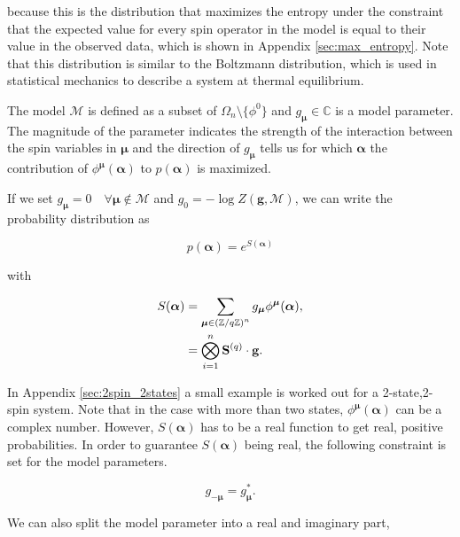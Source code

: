 \noindent
because this is the distribution that maximizes the entropy under the constraint that the expected value for every spin operator in the model is equal to their value in the observed data, which is shown in Appendix \ref{sec:max_entropy}.
Note that this distribution is similar to the Boltzmann distribution, which is used in statistical mechanics to describe a system at thermal equilibrium.

The model $\mathcal{M}$ is defined as a subset of $\Omega_n \setminus \{ \phi^0 \}$ and $g_{\boldsymbol{\mu}} \in {\mathbb{C}}$ is a model parameter. 
The magnitude of the parameter indicates the strength of the interaction between the spin variables in $\boldsymbol{\mu}$ and the direction of $g_{\boldsymbol{\mu}}$ tells us for which $\boldsymbol{\alpha}$ the contribution of $\phi^{\boldsymbol{\mu}}(\boldsymbol{\alpha})$ to $p(\boldsymbol{\alpha})$ is maximized.

\noindent
If we set $g_{\boldsymbol{\mu}} = 0 \quad \forall \boldsymbol{\mu} \notin \mathcal{M}$ and $g_0 = -\log Z(\mathbf{g}, \mathcal{M})$, we can write the probability distribution as

\begin{equation}
    p(\boldsymbol{\alpha}) =e^{S(\boldsymbol{\alpha})}\label{eq:p_alpha_s_alpha}
\end{equation}

\noindent
with

\begin{align}
    S(\boldsymbol{\alpha}) &= \sum_{\boldsymbol{\mu} \in {(\mathbb{Z}/q\mathbb{Z})}^n} g_{\boldsymbol{\mu}} \phi^{\boldsymbol{\mu}}(\boldsymbol{\alpha}),\notag \\
    &= \bigotimes_{i = 1}^{n} \mathbf{S}^{(q)} \cdot \mathbf{g}.\label{eq:s_alpha}
\end{align}

\noindent
In Appendix \ref{sec:2spin_2states} a small example is worked out for a 2-state,2-spin system.
Note that in the case with more than two states, $\phi^{\boldsymbol{\mu}}(\boldsymbol{\alpha})$ can be a complex number. However, $S(\boldsymbol{\alpha})$ has to be a real function to get real, positive probabilities.
In order to guarantee $S(\boldsymbol{\alpha})$ being real, the following constraint is set for the model parameters.

\begin{equation}
    g_{-\boldsymbol{\mu}} = g_{\boldsymbol{\mu}}^*.
\end{equation}


\noindent
We can also split the model parameter into a real and imaginary part,

